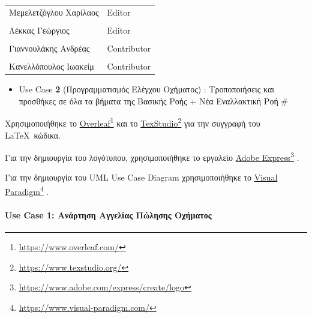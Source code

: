 \documentclass{../ol-softwaremanual}
\newcommand{\doclink}[2]{\href{#1}{#2}\footnote{\url{#1}}}
\begin{document}
	
	\vspace{20pt}
	
	\begin{table}[htbp!]
		\begin{tabular}{ll}
			Μεμελετζόγλου Χαρίλαος & \en Editor \\
			\\ Λέκκας Γεώργιος      &   \en  Editor \\
			\\ Γιαννουλάκης Ανδρέας & \en Contributor \\
			\\ Κανελλόπουλος Ιωακείμ & \en Contributor \\ 
		\end{tabular}
	\end{table}


	\vspace{10pt}
	
	\begin{itemize}
		\item \en Use Case \textbf{2} \gr (Προγραμματισμός Ελέγχου Οχήματος) : Τροποποιήσεις και προσθήκες σε όλα τα βήματα της Βασικής Ροής + Νέα Εναλλακτική Ροή \en \# 
	\end{itemize}
	


	\newpage	
	
	
	\vspace{20pt}
	\flushleft
	Χρησιμοποιήθηκε το \en \doclink{https://www.overleaf.com/}{Overleaf} \gr και το \en \doclink{https://www.texstudio.org/}{TexStudio} \gr για την συγγραφή του \LaTeX\ κώδικα. \break
	
	Για την δημιουργία του λογότυπου, χρησιμοποιήθηκε το εργαλείο \en \doclink{https://www.adobe.com/express/create/logo}{Adobe Express} . \gr \break
	
	Για την δημιουργία του \en UML Use Case Diagram \gr χρησιμοποιήθηκε το \en \doclink{https://www.visual-paradigm.com/}{Visual Paradigm} . \gr \break 
	
	\newpage
	
	
	\paragraph{\en Use Case 1: \gr Ανάρτηση Αγγελίας Πώλησης Οχήματος}
	
\end{document}
